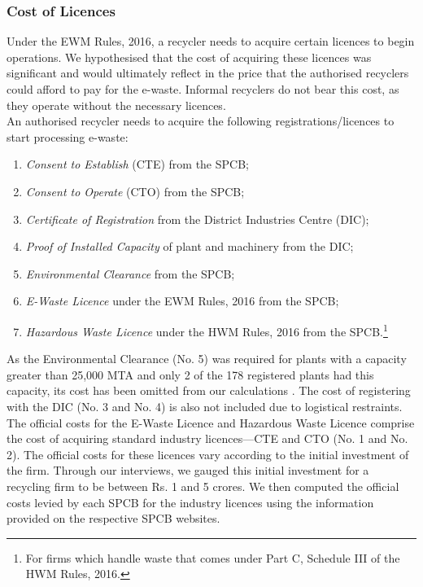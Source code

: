 \documentclass[a4paper, 12pt]{article}
\begin{document}
\subsubsection{Cost of Licences}
                    
                    Under the EWM Rules, 2016, a recycler needs to acquire certain licences to begin operations. We hypothesised that the cost of acquiring these licences was significant and would ultimately reflect in the price that the authorised recyclers could afford to pay for the e-waste. Informal recyclers do not bear this cost, as they operate without the necessary licences. \\
                    
                    An authorised recycler needs to acquire the following registrations/licences to start processing e-waste:                  
\begin{enumerate}
\item \textit{Consent to Establish} (CTE) from the SPCB;
\item \textit{Consent to Operate} (CTO) from the SPCB;
\item \textit{Certificate of Registration} from the District Industries Centre (DIC);
\item \textit{Proof of Installed Capacity} of plant and machinery from the DIC;
\item \textit{Environmental Clearance} from the SPCB; 
\item \textit{E-Waste Licence} under the EWM Rules, 2016 from the SPCB;
\item \textit{Hazardous Waste Licence} under the HWM Rules, 2016 from the SPCB.\footnote{For firms which handle waste that comes under Part C, Schedule III of the HWM Rules, 2016.} 
\end{enumerate}
                    
                    As the Environmental Clearance (No. 5) was required for plants with a capacity greater than 25,000 MTA and only 2 of the 178 registered plants had this capacity, its cost has been omitted from our calculations \parencite{cpcbrecyclersreport}. The cost of registering with the DIC (No. 3 and No. 4) is also not included due to logistical restraints.\\
                    
                    The official costs for the E-Waste Licence and Hazardous Waste Licence comprise the cost of acquiring standard industry licences—CTE and CTO (No. 1 and No. 2). The official costs for these licences vary according to the initial investment of the firm. Through our interviews, we gauged this initial investment for a recycling firm to be between Rs. 1 and 5 crores. We then computed the official costs levied by each SPCB for the industry licences using the information provided on the respective SPCB websites.\\ 
                    
\end{document}
